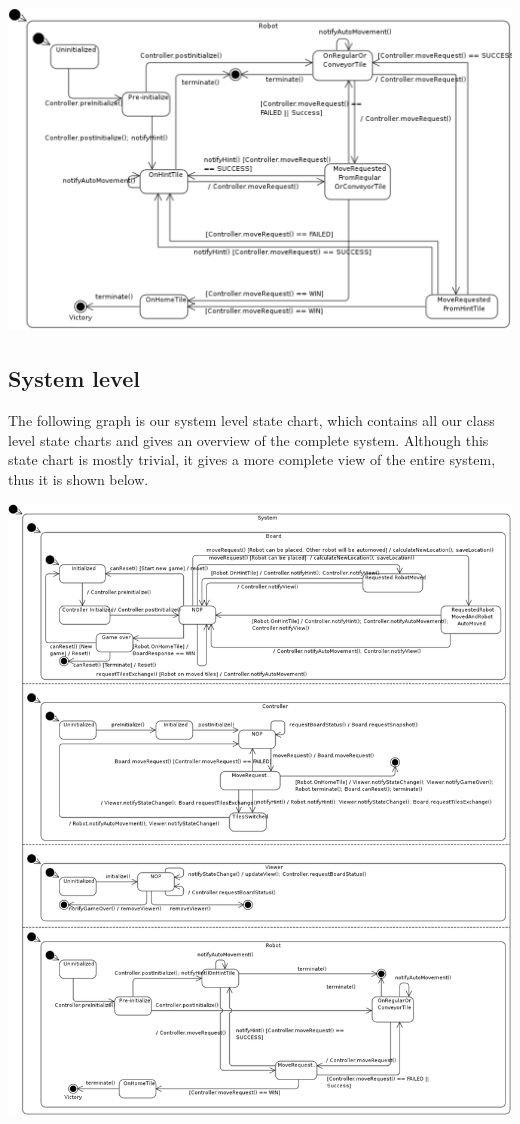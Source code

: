 	\includegraphics[width=\linewidth]{statecharts/robot.pdf}

\subsection{System level}
	The following graph is our system level state chart, which contains all our class level state charts and gives an overview of the complete system. Although this state chart is mostly trivial, it gives a more complete view of the entire system, thus it is shown below. 

	\includegraphics[width=\linewidth]{statecharts/system.pdf}

	
